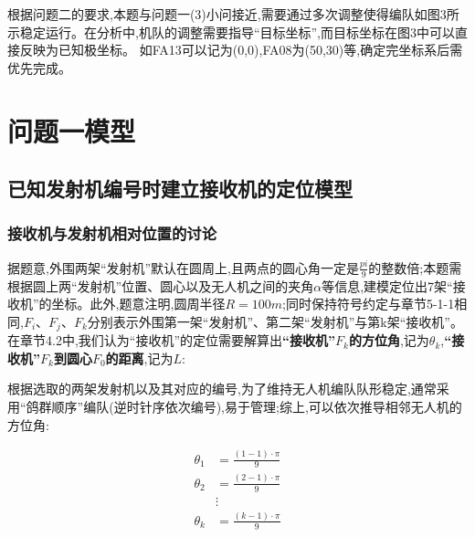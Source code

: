 \documentclass[withoutpreface,bwprint]{cumcmthesis} %
\begin{document}
		根据问题二的要求,本题与问题一(3)小问接近,需要通过多次调整使得编队如图3所示稳定运行。在分析中,机队的调整需要指导“目标坐标”,而目标坐标在图3中可以直接反映为已知极坐标。
		如FA13可以记为(0,0\textdegree),FA08为(50,30\textdegree)等,确定完坐标系后需优先完成。
	
	\section{问题一模型}
	  \subsection{已知发射机编号时建立接收机的定位模型}
		\subsubsection{接收机与发射机相对位置的讨论}
			
			据题意,外围两架“发射机”默认在圆周上,且两点的圆心角一定是$\frac{pi}{9}$的整数倍;本题需根据圆上两“发射机”位置、圆心以及无人机之间的夹角$\alpha$等信息,建模定位出7架“接收机”的坐标。此外,题意注明,圆周半径$R=100m$;同时保持符号约定与章节5-1-1相同,$F_{i}$、$F_{j}$、$F_{k}$分别表示外围第一架“发射机”、第二架“发射机”与第k架“接收机”。在章节4.2中,我们认为“接收机”的定位需要解算出\textbf{“接收机”$F_{k}$的方位角},记为$\theta_{k}$,\textbf{“接收机”$F_{k}$到圆心$F_{0}$的距离},记为$L$:	
	
		根据选取的两架发射机以及其对应的编号,为了维持无人机编队队形稳定,通常采用“鸽群顺序”\cite{zzbh2015}编队(逆时针序依次编号),易于管理;综上,可以依次推导相邻无人机的方位角:
		
				\begin{equation}
					\tag{6-1-1}
					\begin{split}
			    	\theta_{1}&= \frac{(1-1)\cdot\pi}{9} \\
			    		\theta_{2}&= \frac{(2-1)\cdot\pi}{9}\\
			    	    	&\vdots\\
			    			\theta_{k}&= \frac{(k-1)\cdot\pi}{9}
			    			\end{split}	
				\end{equation}
		
\end{document}
